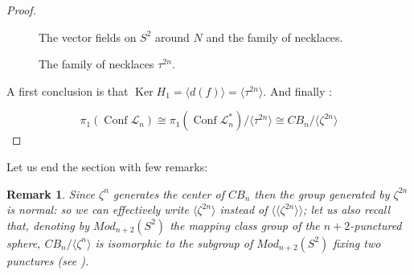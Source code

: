 \documentclass[11pt]{amsart}
\newtheorem{remark}[theorem]{Remark}
\begin{document}
\begin{proof}
\begin{figure}
\begin{tikzpicture}[scale=0.9]
\end{tikzpicture}

 \caption{\label{fig:vector}The vector fields on $S^2$ around $N$ and the family of necklaces.
 \label{fig:dipole}}
\end{figure}

\begin{figure}
 

 \caption{\label{fig:tau2n}The family of necklaces $\tau^{2n}$.}
\end{figure}

A first conclusion is that ${\mathop{\mathrm{Ker}}\nolimits} H_1 = \langle d(f) \rangle = \langle \tau^{2n} \rangle$.
And finally : 

$$\pi_1({\mathop{\mathrm{Conf}}\nolimits} \mathcal{L}_n)
\cong 
\pi_1({\mathop{\mathrm{Conf}}\nolimits} \mathcal{L}_n^*) / \langle \tau^{2n} \rangle
\cong
CB_n/\langle \zeta^{2n} \rangle$$
\end{proof}

Let us end the section with few remarks:

\begin{remark}
 Since $\zeta^n$ generates the center of $CB_n$ then the group generated  by  $\zeta^{2n}$ is normal: so we can effectively write $\langle \zeta^{2n} \rangle$
instead of  $\langle \langle \zeta^{2n} \rangle \rangle$; let us also recall that, denoting by $Mod_{n+2}(S^2)$  the mapping class group
of the $n+2$-punctured sphere,  $CB_n/\langle \zeta^{n} \rangle$ is isomorphic to the subgroup
of $Mod_{n+2}(S^2)$ fixing  two punctures (see \cite{CC}).
\end{remark}
\end{document}

